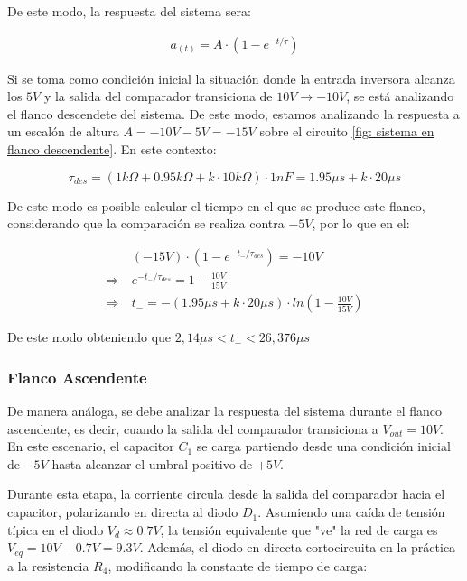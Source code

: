 De este modo, la respuesta del sistema sera:

\begin{align*}
    a_{(t)} = A \cdot (1 - e^{-t/\tau})
\end{align*}

Si se toma como condición inicial la situación donde la entrada inversora alcanza los $5V$ y la salida del comparador transiciona de $10V \rightarrow -10V$, se está analizando el flanco descendete del sistema. De este modo, estamos analizando la respuesta a un escalón de altura $A = -10V-5V=-15V$ sobre el circuito \ref{fig: sistema en flanco descendente}. En este contexto:

\begin{equation}
    \tau_{des} = (1k\Omega + 0.95k\Omega + k \cdot 10k\Omega) \cdot 1nF = 1.95\mu s + k \cdot 20\mu s
\end{equation}

De este modo es posible calcular el tiempo en el que se produce este flanco, considerando que la comparación se realiza contra $-5V$, por lo que en el:

\begin{align*}
    &(-15V) \cdot (1 - e^{-t_-/\tau_{des}}) = -10V \\
\Longrightarrow \: & e^{-t_-/\tau_{des}} = 1 - \frac{10V}{15V} \\
\Longrightarrow \: & t_- = -(1.95\mu s + k \cdot 20\mu s) \cdot ln\left(1 - \frac{10V}{15V}\right)
\end{align*}

\noindent De este modo obteniendo que \textbf{$ 2,14\mu s< t_- <26,376\mu s$}

\subsubsection{Flanco Ascendente}
De manera análoga, se debe analizar la respuesta del sistema durante el flanco ascendente, es decir, cuando la salida del comparador transiciona a $V_{out} = 10V$. En este escenario, el capacitor $C_1$ se carga partiendo desde una condición inicial de $-5V$ hasta alcanzar el umbral positivo de $+5V$. 

Durante esta etapa, la corriente circula desde la salida del comparador hacia el capacitor, polarizando en directa al diodo $D_1$. Asumiendo una caída de tensión típica en el diodo $V_d \approx 0.7V$, la tensión equivalente que "ve" la red de carga es $V_{eq} = 10V - 0.7V = 9.3V$. Además, el diodo en directa cortocircuita en la práctica a la resistencia $R_4$, modificando la constante de tiempo de carga:

